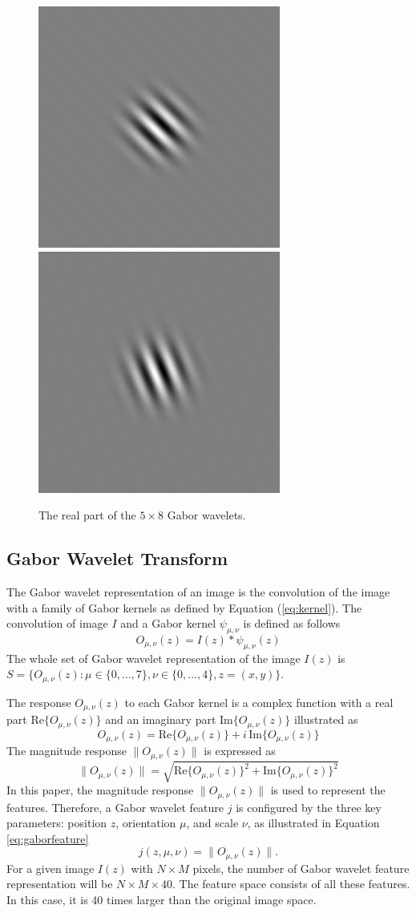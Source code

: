 \documentclass[a4paper,10pt]{article}
\begin{document}
\begin{figure}[ht]
\begin{center}
 \includegraphics[width=0.11\columnwidth]{figures/rGabor4_6.jpg}
 \includegraphics[width=0.11\columnwidth]{figures/rGabor4_7.jpg}\\
\caption{The real part of the $5\times8$ Gabor wavelets.}
\label{fig:realgabor}
\end{center}
\end{figure} 

\subsection{Gabor Wavelet Transform}
The Gabor wavelet representation of an image is the convolution of the image with a family of Gabor kernels as defined by \mbox{Equation} (\ref{eq:kernel}). The convolution of image $I$ and a Gabor kernel $\psi_{\mu,\nu}$ is defined as follows 
\begin{equation}\label{eq:conv}
O_{\mu,\nu}(z)=I(z)\ast\psi_{\mu,\nu}(z)
\end{equation}
The whole set of Gabor wavelet representation of the image $I(z)$ is $S=\{O_{\mu,\nu}(z):\mu\in\{0,\ldots,7\},\nu\in\{0,\ldots,4\},z=(x,y)\}$.

The response $O_{\mu,\nu}(z)$ to each Gabor kernel is a complex function with a real part $\textrm{Re}\{O_{\mu,\nu}(z)\}$ and an imaginary part $\textrm{Im}\{O_{\mu,\nu}(z)\}$ illustrated as
\begin{displaymath}
O_{\mu,\nu}(z) = \textrm{Re}\{O_{\mu,\nu}(z)\} +i\,\textrm{Im}\{O_{\mu,\nu}(z)\}
\end{displaymath}
The magnitude response $\|O_{\mu,\nu}(z)\|$ is expressed as
\begin{equation}
\|O_{\mu,\nu}(z)\| = \sqrt{\textrm{Re}\{O_{\mu,\nu}(z)\}^2 + \textrm{Im}\{O_{\mu,\nu}(z)\}^2}
\end{equation}
In this paper, the magnitude response $\|O_{\mu,\nu}(z)\|$ is used to represent the features. Therefore, a Gabor wavelet feature $j$ is configured by the three key parameters: position $z$, orientation $\mu$, and scale $\nu$, as illustrated in \mbox{Equation} \ref{eq:gaborfeature}
\begin{equation}\label{eq:gaborfeature}
j(z, \mu, \nu) = \|O_{\mu,\nu}(z)\|.
\end{equation}
For a given image $I(z)$ with $N \times M$ pixels, the number of Gabor wavelet feature representation will be $N \times M \times 40$. The feature space consists of all these features. In this case, it is 40 times larger than the original image space.
\end{document}
